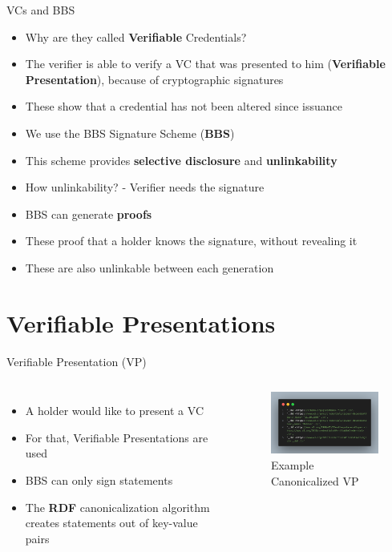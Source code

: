 \documentclass[
	english,%
	authorontitle=true,
	]{bfhbeamer}
\begin{document}
\begin{frame}{VCs and BBS}
    \begin{itemize}
        \item Why are they called \textbf{Verifiable} Credentials?
        \item The verifier is able to verify a VC that was presented to him (\textbf{Verifiable Presentation}), because of cryptographic signatures
        \item These show that a credential has not been altered since issuance
        \item We use the BBS Signature Scheme (\textbf{BBS})
        \item This scheme provides \textbf{selective disclosure} and \textbf{unlinkability}
        \item How unlinkability? - Verifier needs the signature
        \item BBS can generate \textbf{proofs} 
        \item These proof that a holder knows the signature, without revealing it
        \item These are also unlinkable between each generation
    \end{itemize}
\end{frame}

\section{Verifiable Presentations}

\begin{frame}{Verifiable Presentation (VP)}
    \begin{columns}[onlytextwidth,T]
        \column{70mm}  
        \begin{itemize}
            \item A holder would like to present a VC
            \item For that, Verifiable Presentations are used
            \item BBS can only sign statements
            \item The \textbf{RDF} canonicalization algorithm creates statements out of key-value pairs
        \end{itemize}

        \column{70mm}

        \begin{figure}
            \centering
            \includegraphics[width=70mm]{./img/VPcanon.png}
            \caption{Example Canonicalized VP}
        \end{figure}

    \end{columns}
\end{frame}
\end{document}
